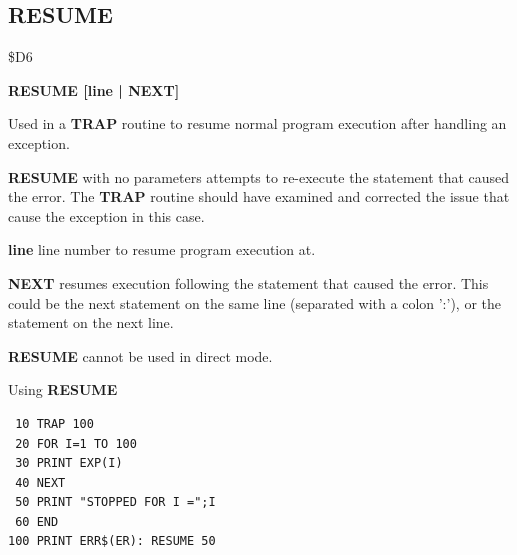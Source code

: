 \subsection{RESUME}
\begin{description}[leftmargin=2cm,style=nextline]
\item [Token:] \$D6
\item [Format:] {\bf RESUME [line | NEXT]}
\item [Usage:]  Used in a {\bf TRAP} routine to
                resume normal program execution after
                handling an exception.

                {\bf RESUME} with no parameters attempts to
                re-execute the statement that caused the error.
                The {\bf TRAP} routine should have examined
                and corrected the issue that cause the exception in this case.

                {\bf line} line number to resume program execution at.

                {\bf NEXT} resumes execution following the statement that caused
                the error. This could be the next statement on the same line
                (separated with a colon ':'), or the statement on the next line.

\item [Remarks:] {\bf RESUME} cannot be used in direct mode.
\item [Example:] Using {\bf RESUME}

\begin{tcolorbox}[colback=black,coltext=white]
\verbatimfont{\codefont}
\begin{verbatim}
 10 TRAP 100
 20 FOR I=1 TO 100
 30 PRINT EXP(I)
 40 NEXT
 50 PRINT "STOPPED FOR I =";I
 60 END
100 PRINT ERR$(ER): RESUME 50
\end{verbatim}
\end{tcolorbox}
\end{description}


\newpage
